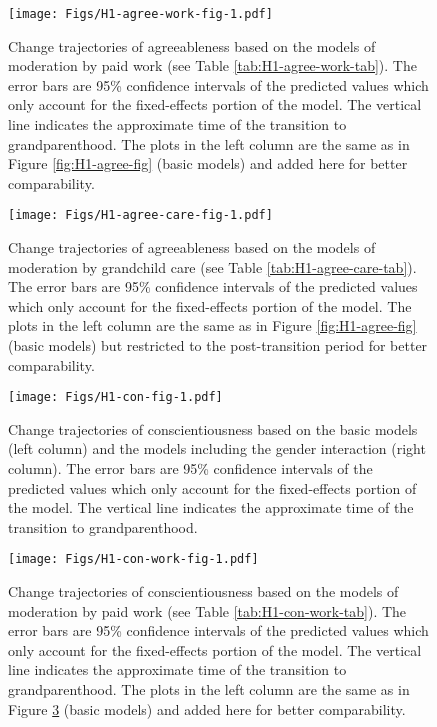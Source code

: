 \documentclass[
  english,
  man, noextraspace]{apa7}
\begin{document}
\begin{appendix}
\begin{figure}
\centering
\texttt{[image: Figs/H1-agree-work-fig-1.pdf]}
\caption{\label{fig:H1-agree-work-fig}Change trajectories of agreeableness based
on the models of moderation by paid work (see Table
\ref{tab:H1-agree-work-tab}). The error bars are 95\% confidence
intervals of the predicted values which only account for the
fixed-effects portion of the model. The vertical line indicates the
approximate time of the transition to grandparenthood. The plots in the
left column are the same as in Figure \ref{fig:H1-agree-fig} (basic
models) and added here for better comparability.}
\end{figure}









\begin{figure}
\centering
\texttt{[image: Figs/H1-agree-care-fig-1.pdf]}
\caption{\label{fig:H1-agree-care-fig}Change trajectories of agreeableness based
on the models of moderation by grandchild care (see Table
\ref{tab:H1-agree-care-tab}). The error bars are 95\% confidence
intervals of the predicted values which only account for the
fixed-effects portion of the model. The plots in the left column are the
same as in Figure \ref{fig:H1-agree-fig} (basic models) but restricted
to the post-transition period for better comparability.}
\end{figure}








\begin{figure}
\centering
\texttt{[image: Figs/H1-con-fig-1.pdf]}
\caption{\label{fig:H1-con-fig}Change trajectories of conscientiousness based on
the basic models (left column) and the models including the gender
interaction (right column). The error bars are 95\% confidence intervals
of the predicted values which only account for the fixed-effects portion
of the model. The vertical line indicates the approximate time of the
transition to grandparenthood.}
\end{figure}










\begin{figure}
\centering
\texttt{[image: Figs/H1-con-work-fig-1.pdf]}
\caption{\label{fig:H1-con-work-fig}Change trajectories of conscientiousness based
on the models of moderation by paid work (see Table
\ref{tab:H1-con-work-tab}). The error bars are 95\% confidence intervals
of the predicted values which only account for the fixed-effects portion
of the model. The vertical line indicates the approximate time of the
transition to grandparenthood. The plots in the left column are the same
as in Figure \ref{fig:H1-con-fig} (basic models) and added here for
better comparability.}
\end{figure}










\end{appendix}
\end{document}
